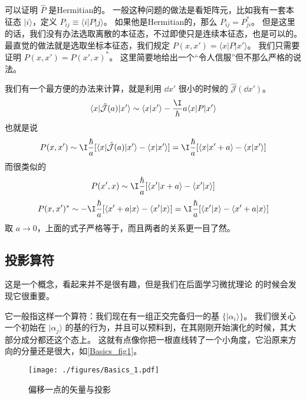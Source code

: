 \begin{example}{}
可以证明 $\hat{P}$ 是Hermitian的。 一般这种问题的做法是看矩阵元，比如我有一套本征态 $|i\rangle$，定义 $P_{ij} \equiv \langle i|P|j\rangle$。 如果他是Hermitian的，那么 $P_{ij} = P_{ji}^*$。 但是这里的话，我们没有办法选取离散的本征态，不过即使只是连续本征态，也是可以的。 最直觉的做法就是选取坐标本征态，我们规定 $P(x,x') = \langle x|P|x'\rangle$。 我们只需要证明 $P(x,x') = P(x',x)^*$。 这里简要地给出一个“令人信服”但不那么严格的说法。

我们有一个最方便的办法来计算，就是利用 $\dd{x'}$ 很小的时候的 $\hat{\mathcal{J}}(\dd{x'})$。
\begin{equation}
\langle x|\hat{\mathcal{J}}(a)|x'\rangle \sim \langle x|x'\rangle - \frac{\I}{\hbar} a \langle x|P|x'\rangle
\end{equation}
也就是说
\begin{equation}
P(x,x') \sim \I\frac{\hbar}{a}[\langle x|\hat{\mathcal{J}}(a)|x'\rangle - \langle x|x'\rangle] = \I\frac{\hbar}{a}[\langle x|x'+a\rangle - \langle x|x'\rangle]
\end{equation}
而很类似的
\begin{equation}
P(x',x) \sim \I\frac{\hbar}{a}[\langle x'|x+a\rangle - \langle x'|x\rangle]
\end{equation}
\begin{equation}
P(x,x')^* \sim -\I\frac{\hbar}{a} [\langle x'+a|x\rangle - \langle x'|x\rangle] = \I\frac{\hbar}{a} [\langle x'|x\rangle - \langle x'+a|x\rangle]
\end{equation}
取 $a\rightarrow0$，上面的式子严格等于，而且两者的关系更一目了然。
\end{example}

\subsection{投影算符}

这是一个概念，看起来并不是很有趣，但是我们在后面学习微扰理论%
的时候会发现它很重要。

它一般指这样一个算符：我们现在有一组正交完备归一的基 $\{|\alpha_i\rangle\}$。 我们很关心一个初始在 $|\alpha_j\rangle$ 的基的行为，并且可以预料到，在其刚刚开始演化的时候，其大部分成分都还这个态上。 这就有点像你把一根直线转了一个小角度，它沿原来方向的分量还是很大，如\autoref{Basics_fig1}。

\begin{figure}[ht]
\centering
\texttt{[image: ./figures/Basics\_1.pdf]}
\caption{偏移一点的矢量与投影} \label{Basics_fig1}
\end{figure}

